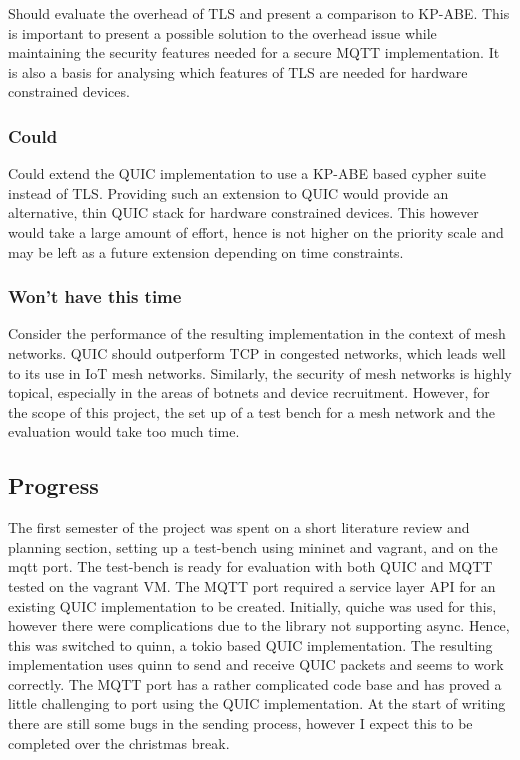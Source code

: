 \documentclass[11pt]{article}
\begin{document}
Should evaluate the overhead of TLS and present a comparison to KP-ABE.
This is important to present a possible solution to the overhead issue while maintaining the security features needed for a secure MQTT implementation.
It is also a basis for analysing which features of TLS are needed for hardware constrained devices.

\subsubsection*{Could}

Could extend the QUIC implementation to use a KP-ABE based cypher suite instead of TLS.
Providing such an extension to QUIC would provide an alternative, thin QUIC stack for hardware constrained devices.
This however would take a large amount of effort, hence is not higher on the priority scale and may be left as a future extension depending on time constraints.

\subsubsection*{Won't have this time}

Consider the performance of the resulting implementation in the context of mesh networks.
QUIC should outperform TCP in congested networks, which leads well to its use in IoT mesh networks.
Similarly, the security of mesh networks is highly topical, especially in the areas of botnets and device recruitment.
However, for the scope of this project, the set up of a test bench for a mesh network and the evaluation would take too much time.

\subsection{Progress}\label{progress}

The first semester of the project was spent on a short literature review and planning section, setting up a test-bench using mininet and vagrant, and on the mqtt port.
The test-bench is ready for evaluation with both QUIC and MQTT tested on the vagrant VM.
The MQTT port required a service layer API for an existing QUIC implementation to be created.
Initially, quiche was used for this, however there were complications due to the library not supporting async.
Hence, this was switched to quinn, a tokio based QUIC implementation.
The resulting implementation uses quinn to send and receive QUIC packets and seems to work correctly.
The MQTT port has a rather complicated code base and has proved a little challenging to port using the QUIC implementation.
At the start of writing there are still some bugs in the sending process, however I expect this to be completed over the christmas break.
\end{document}
